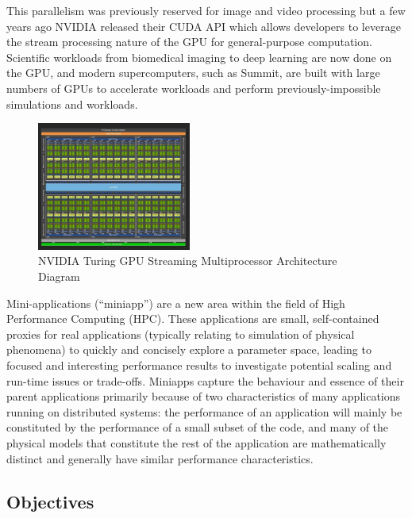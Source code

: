 \documentclass[conference]{IEEEtran}
\begin{document}
This parallelism was previously reserved for image and video processing but a few years ago NVIDIA released their CUDA API\cite{cuda_talk}\cite{CUDA} which allows developers to leverage the stream processing nature of the GPU for general-purpose computation. Scientific workloads from biomedical imaging\cite{luebke2008cuda} to deep learning\cite{tang2013deep} are now done on the GPU, and modern supercomputers, such as Summit, are built with large numbers of GPUs to accelerate workloads and perform previously-impossible simulations and workloads.

\begin{figure}
\centering
\includegraphics[width=0.45\textwidth]{gpu_diagram.jpg}
\caption{NVIDIA Turing GPU Streaming Multiprocessor Architecture Diagram}
\label{fig:gpu_diagram}
\end{figure}

Mini-applications (``miniapp”) are a new area within the field of High Performance Computing (HPC). These applications are small, self-contained proxies for real applications (typically relating to simulation of physical phenomena) to quickly and concisely explore a parameter space, leading to focused and interesting performance results to investigate potential scaling and run-time issues or trade-offs\cite{miniapps}. Miniapps capture the behaviour and essence of their parent applications primarily because of two characteristics of many applications running on distributed systems: the performance of an application will mainly be constituted by the performance of a small subset of the code, and many of the physical models that constitute the rest of the application are mathematically distinct and generally have similar performance characteristics\cite{miniapps}.

\subsection{Objectives}
\end{document}
